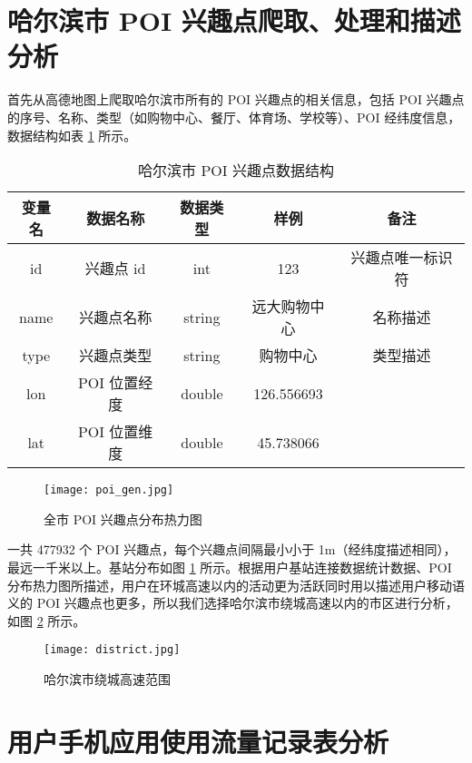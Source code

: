 \section{哈尔滨市 POI 兴趣点爬取、处理和描述分析}

首先从高德地图上爬取哈尔滨市所有的 POI 兴趣点的相关信息，包括 POI 兴趣点的序号、名称、类型（如购物中心、餐厅、体育场、学校等）、POI 经纬度信息，数据结构如表 \ref{tab:poi_info} 所示。

\begin{table}[htbp]
    \caption{哈尔滨市 POI 兴趣点数据结构}
    \vspace{0.5em}\centering\wuhao
    \begin{tabular}{ccccc}
        \toprule[1.5pt]
        变量名 & 数据名称 & 数据类型 & 样例 & 备注 \\
        \midrule[1pt]
        id & 兴趣点 id & int & 123 & 兴趣点唯一标识符 \\
        name & 兴趣点名称 & string & 远大购物中心 & 名称描述 \\
        type & 兴趣点类型 & string & 购物中心 & 类型描述 \\
        lon & POI 位置经度 & double & 126.556693 & \\
        lat & POI 位置维度 & double & 45.738066 & \\
        \bottomrule[1.5pt]
    \end{tabular}
    \label{tab:poi_info}
\end{table}

\begin{figure}[htbp]
    \centering
    \texttt{[image: poi\_gen.jpg]}
    \caption{全市 POI 兴趣点分布热力图}
    \label{fig:poi_gen}
\end{figure}

一共 477932 个 POI 兴趣点，每个兴趣点间隔最小小于 1m（经纬度描述相同），最远一千米以上。基站分布如图 \ref{fig:poi_gen} 所示。根据用户基站连接数据统计数据、POI 分布热力图所描述，用户在环城高速以内的活动更为活跃同时用以描述用户移动语义的 POI 兴趣点也更多，所以我们选择哈尔滨市绕城高速以内的市区进行分析，如图 \ref{fig:harbin_raocheng} 所示。

\begin{figure}[htbp]
    \centering
    \texttt{[image: district.jpg]}
    \caption{哈尔滨市绕城高速范围}
    \label{fig:harbin_raocheng}
\end{figure}

\section{用户手机应用使用流量记录表分析}

